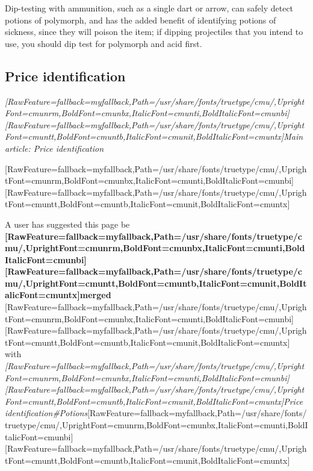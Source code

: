 Dip-{}testing with ammunition, such as a single dart or arrow\footnotemark[135], can safely detect potions of polymorph, and has the added benefit of identifying potions of sickness, since they will poison the item; if dipping projectiles that you intend to use, you should dip test for polymorph and acid first.



\subsection{Price identification}
\label{6}

\begin{myquote}
\item{}{\itshape \allowbreak{}\setmainfont{cmunti.ttf}[RawFeature={fallback=myfallback},Path=/usr/share/fonts/truetype/cmu/,UprightFont=cmunrm,BoldFont=cmunbx,ItalicFont=cmunti,BoldItalicFont=cmunbi]\setmonofont{cmunti.ttf}[RawFeature={fallback=myfallback},Path=/usr/share/fonts/truetype/cmu/,UprightFont=cmuntt,BoldFont=cmuntb,ItalicFont=cmunit,BoldItalicFont=cmuntx]\itshape Main article: Price identification\footnotemark[136]}
\end{myquote}
\allowbreak{}\setmainfont{cmunrm.ttf}[RawFeature={fallback=myfallback},Path=/usr/share/fonts/truetype/cmu/,UprightFont=cmunrm,BoldFont=cmunbx,ItalicFont=cmunti,BoldItalicFont=cmunbi]\setmonofont{cmunrm.ttf}[RawFeature={fallback=myfallback},Path=/usr/share/fonts/truetype/cmu/,UprightFont=cmuntt,BoldFont=cmuntb,ItalicFont=cmunit,BoldItalicFont=cmuntx]

A user has suggested this page be {\bfseries \allowbreak{}\setmainfont{cmunbx.ttf}[RawFeature={fallback=myfallback},Path=/usr/share/fonts/truetype/cmu/,UprightFont=cmunrm,BoldFont=cmunbx,ItalicFont=cmunti,BoldItalicFont=cmunbi]\setmonofont{cmunbx.ttf}[RawFeature={fallback=myfallback},Path=/usr/share/fonts/truetype/cmu/,UprightFont=cmuntt,BoldFont=cmuntb,ItalicFont=cmunit,BoldItalicFont=cmuntx]\bfseries merged}{$\text{ }$}\allowbreak{}\setmainfont{cmunrm.ttf}[RawFeature={fallback=myfallback},Path=/usr/share/fonts/truetype/cmu/,UprightFont=cmunrm,BoldFont=cmunbx,ItalicFont=cmunti,BoldItalicFont=cmunbi]\setmonofont{cmunrm.ttf}[RawFeature={fallback=myfallback},Path=/usr/share/fonts/truetype/cmu/,UprightFont=cmuntt,BoldFont=cmuntb,ItalicFont=cmunit,BoldItalicFont=cmuntx] with {\itshape \allowbreak{}\setmainfont{cmunti.ttf}[RawFeature={fallback=myfallback},Path=/usr/share/fonts/truetype/cmu/,UprightFont=cmunrm,BoldFont=cmunbx,ItalicFont=cmunti,BoldItalicFont=cmunbi]\setmonofont{cmunti.ttf}[RawFeature={fallback=myfallback},Path=/usr/share/fonts/truetype/cmu/,UprightFont=cmuntt,BoldFont=cmuntb,ItalicFont=cmunit,BoldItalicFont=cmuntx]\itshape {}Price identification\#Potions}\allowbreak{}\setmainfont{cmunrm.ttf}[RawFeature={fallback=myfallback},Path=/usr/share/fonts/truetype/cmu/,UprightFont=cmunrm,BoldFont=cmunbx,ItalicFont=cmunti,BoldItalicFont=cmunbi]\setmonofont{cmunrm.ttf}[RawFeature={fallback=myfallback},Path=/usr/share/fonts/truetype/cmu/,UprightFont=cmuntt,BoldFont=cmuntb,ItalicFont=cmunit,BoldItalicFont=cmuntx]




